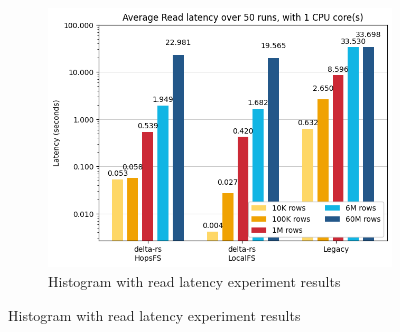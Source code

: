 \begin{figure}
    \centering
    \begin{subfigure}[b]{\textwidth}
        \includegraphics[width=\textwidth]{figures/5-results/read/read_time_1_core.png}
        \caption{Histogram with read latency experiment results}
        \label{fig:res_read_time}
    \end{subfigure}
    

\end{figure}
